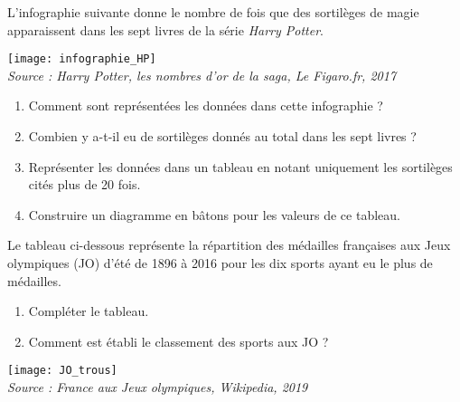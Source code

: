 \begin{colonne*exercice}
\bigskip


\begin{exercice} %
   L'infographie suivante donne le nombre de fois que des sortilèges de magie apparaissent dans les sept livres de la série {\it Harry Potter}.
   \begin{center}
      \texttt{[image: infographie\_HP]} \\
      \hfill {\footnotesize\it Source : Harry Potter, les nombres d'or de la saga, Le Figaro.fr, 2017}
   \end{center}
   \begin{enumerate}
      \item Comment sont représentées les données dans cette infographie ?
      \item Combien y a-t-il eu de sortilèges donnés au total dans les sept livres ?
      \item Représenter les données dans un tableau en notant uniquement les sortilèges cités plus de 20 fois.
      \item Construire un diagramme en bâtons pour les valeurs de ce tableau. \\
   \end{enumerate}
\end{exercice}

\begin{exercice} %
   Le tableau ci-dessous représente la répartition des médailles françaises aux Jeux olympiques (JO) d'été de 1896 à 2016 pour les dix sports ayant eu le plus de médailles.
   \begin{enumerate}
      \item Compléter le tableau.
      \item Comment est établi le classement des sports aux JO ?
   \end{enumerate}
   \begin{center}
      \texttt{[image: JO\_trous]} \\
      \hfill {\footnotesize\it Source : France aux Jeux olympiques, Wikipedia, 2019}
   \end{center}
\end{exercice}


\end{colonne*exercice}
